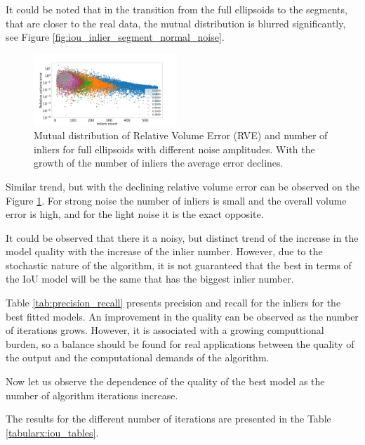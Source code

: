 It could be noted that in the transition from the full ellipsoids to the segments, that are closer to the real data, the mutual distribution is blurred significantly, see Figure \ref{fig:iou_inlier_segment_normal_noise}.

\begin{figure}[!htb]
  \centering
      \includegraphics[width=0.48\textwidth]{images/rve_inlier_normal_noise.png}
      \caption{Mutual distribution of Relative Volume Error (RVE) and number of inliers for full ellipsoids with different noise amplitudes. With the growth of the number of inliers the average error declines.}
      \label{fig:rve_inlier_normal_noise}
\end{figure}

Similar trend, but with the declining relative volume error can be observed on the Figure \ref{fig:rve_inlier_normal_noise}.
For strong noise the number of inliers is small and the overall volume error is high, and for the light noise it is the exact opposite.

It could be observed that there it a noisy, but distinct trend of the increase in the model quality with the increase of the inlier number.
However, due to the stochastic nature of the algorithm, it is not guaranteed that the best in terms of the IoU model will be the same that has the biggest inlier number.

Table \ref{tab:precision_recall} presents precision and recall for the inliers for the best fitted models.
An improvement in the quality can be observed as the number of iterations grows.
However, it is associated with a growing computtional burden, so a balance should be found for real applications between the quality of the output and the computational demands of the algorithm.

Now let us observe the dependence of the quality of the best model as the number of algorithm iterations increase.

The results for the different number of iterations are presented in the Table \ref{tabularx:iou_tables}.

